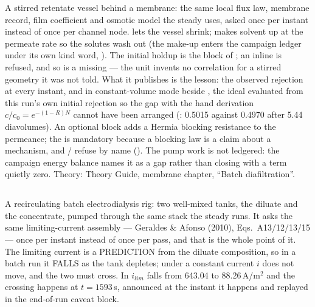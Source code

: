 \documentclass[11pt,a4paper]{article}
\begin{document}
A stirred retentate vessel behind a membrane: the same local flux law,
membrane record, film coefficient and osmotic model the steady
 uses, asked once per instant instead of once per
channel node.   lets the vessel shrink;
 makes solvent up at the permeate rate so the
solutes wash out (the make-up enters the campaign ledger under its own
kind word, ).  The initial holdup is the
 block of ; an inline
 is refused, and so is
a missing  --- the unit invents no correlation for a stirred
geometry it was not told.  What it publishes is the lesson: the observed
rejection at every instant, and in constant-volume mode
 beside , the ideal evaluated from
this run's own initial rejection so the gap with the hand derivation
$c/c_0 = e^{-(1-R)N}$ cannot have been arranged
(: 0.5015 against 0.4970 after 5.44
diavolumes).  An optional 
block adds a Hermia blocking resistance to the permeance; the
 is mandatory because a blocking law is a claim about a
mechanism, and / refuse by name
().  The pump work is not ledgered:
the campaign energy balance names it as a gap rather than closing with a
term quietly zero.  Theory: Theory Guide, membrane chapter, ``Batch
diafiltration''.

\subsection{}

A recirculating batch electrodialysis rig: two well-mixed tanks, the
diluate and the concentrate, pumped through the same stack the steady
 runs.  It asks the same limiting-current
assembly --- Geraldes \& Afonso (2010), Eqs.~A13/12/13/15 --- once per
instant instead of once per pass, and that is the whole point of it.  The
limiting current is a PREDICTION from the diluate composition, so in a
batch run it FALLS as the tank depletes; under a constant current $i$ does
not move, and the two must cross.  In
 $i_{lim}$ falls from 643.04 to
88.26\,A/m$^2$ and the crossing happens at $t = 1593$\,s, announced at the
instant it happens and replayed in the end-of-run caveat block.
\end{document}
